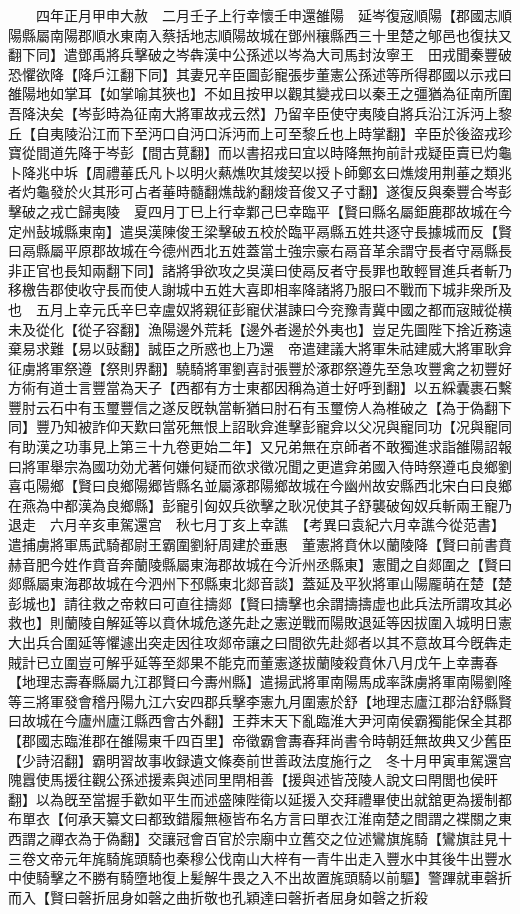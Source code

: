 　　四年正月甲申大赦　二月壬子上行幸懷壬申還雒陽　延岑復宼順陽【郡國志順陽縣屬南陽郡順水東南入蔡括地志順陽故城在鄧州穰縣西三十里楚之郇邑也復扶又翻下同】遣鄧禹將兵擊破之岑犇漢中公孫述以岑為大司馬封汝寧王　田戎聞秦豐破恐懼欲降【降戶江翻下同】其妻兄辛臣圖彭寵張步董憲公孫述等所得郡國以示戎曰雒陽地如掌耳【如掌喻其狹也】不如且按甲以觀其變戎曰以秦王之彊猶為征南所圍吾降決矣【岑彭時為征南大將軍故戎云然】乃留辛臣使守夷陵自將兵沿江泝沔上黎丘【自夷陵沿江而下至沔口自沔口泝沔而上可至黎丘也上時掌翻】辛臣於後盜戎珍寶從間道先降于岑彭【間古莧翻】而以書招戎曰宜以時降無拘前計戎疑臣賣已灼龜卜降兆中坼【周禮菙氏凡卜以明火爇燋吹其焌契以授卜師鄭玄曰燋焌用荆菙之類兆者灼龜發於火其形可占者菙時髓翻燋哉約翻焌音俊又子寸翻】遂復反與秦豐合岑彭擊破之戎亡歸夷陵　夏四月丁巳上行幸鄴己巳幸臨平【賢曰縣名屬鉅鹿郡故城在今定州鼔城縣東南】遣吳漢陳俊王梁擊破五校於臨平鬲縣五姓共逐守長據城而反【賢曰鬲縣屬平原郡故城在今德州西北五姓蓋當土強宗豪右鬲音革余謂守長者守鬲縣長非正官也長知兩翻下同】諸將爭欲攻之吳漢曰使鬲反者守長罪也敢輕冒進兵者斬乃移檄告郡使收守長而使人謝城中五姓大喜即相率降諸將乃服曰不戰而下城非衆所及也　五月上幸元氏辛巳幸盧奴將親征彭寵伏湛諫曰今兖豫青冀中國之都而宼賊從横未及從化【從子容翻】漁陽邊外荒耗【邊外者邊於外夷也】豈足先圖陛下捨近務遠棄易求難【易以䜴翻】誠臣之所惑也上乃還　帝遣建議大將軍朱祜建威大將軍耿弇征虜將軍祭遵【祭則界翻】驍騎將軍劉喜討張豐於涿郡祭遵先至急攻豐禽之初豐好方術有道士言豐當為天子【西都有方士東都因稱為道士好呼到翻】以五綵囊裹石繫豐肘云石中有玉璽豐信之遂反旣執當斬猶曰肘石有玉璽傍人為椎破之【為于偽翻下同】豐乃知被詐仰天歎曰當死無恨上詔耿弇進擊彭寵弇以父况與寵同功【况與寵同有助漢之功事見上第三十九卷更始二年】又兄弟無在京師者不敢獨進求詣雒陽詔報曰將軍舉宗為國功効尤著何嫌何疑而欲求徵况聞之更遣弇弟國入侍時祭遵屯良鄉劉喜屯陽鄉【賢曰良鄉陽郷皆縣名並屬涿郡陽鄉故城在今幽州故安縣西北宋白曰良鄉在燕為中都漢為良鄉縣】彭寵引匈奴兵欲擊之耿况使其子舒襲破匈奴兵斬兩王寵乃退走　六月辛亥車駕還宫　秋七月丁亥上幸譙　【考異曰袁紀六月幸譙今從范書】遣捕虜將軍馬武騎都尉王霸圍劉紆周建於垂惠　董憲將賁休以蘭陵降【賢曰前書賁赫音肥今姓作賁音奔蘭陵縣屬東海郡故城在今沂州丞縣東】憲聞之自郯圍之【賢曰郯縣屬東海郡故城在今泗州下邳縣東北郯音談】蓋延及平狄將軍山陽龎萌在楚【楚彭城也】請往救之帝敕曰可直往擣郯【賢曰擣擊也余謂擣擣虚也此兵法所謂攻其必救也】則蘭陵自解延等以賁休城危遂先赴之憲逆戰而陽敗退延等因拔圍入城明日憲大出兵合圍延等懼遽出突走因往攻郯帝讓之曰間欲先赴郯者以其不意故耳今旣犇走賊計已立圍豈可解乎延等至郯果不能克而董憲遂拔蘭陵殺賁休八月戊午上幸夀春【地理志壽春縣屬九江郡賢曰今夀州縣】遣揚武將軍南陽馬成率誅虜將軍南陽劉隆等三將軍發會稽丹陽九江六安四郡兵擊李憲九月圍憲於舒【地理志廬江郡治舒縣賢曰故城在今廬州廬江縣西會古外翻】王莽末天下亂臨淮大尹河南侯霸獨能保全其郡【郡國志臨淮郡在雒陽東千四百里】帝徵霸會夀春拜尚書令時朝廷無故典又少舊臣【少詩沼翻】霸明習故事收録遺文條奏前世善政法度施行之　冬十月甲寅車駕還宫　隗囂使馬援往觀公孫述援素與述同里閈相善【援與述皆茂陵人說文曰閈閭也侯旰翻】以為旣至當握手歡如平生而述盛陳陛衛以延援入交拜禮畢使出就舘更為援制都布單衣【何承天纂文曰都致錯履無極皆布名方言曰單衣江淮南楚之間謂之褋關之東西謂之禪衣為于偽翻】交讓冠會百官於宗廟中立舊交之位述鸞旗旄騎【鸞旗註見十三卷文帝元年旄騎旄頭騎也秦穆公伐南山大梓有一青牛出走入豐水中其後牛出豐水中使騎擊之不勝有騎墮地復上髪解牛畏之入不出故置旄頭騎以前驅】警蹕就車磬折而入【賢曰磬折屈身如磬之曲折敬也孔穎達曰磬折者屈身如磬之折殺